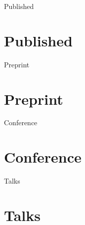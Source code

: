 \documentclass[a4paper,12pt]{article}
\newcommand\myBib[1]{
\begin{btSect}{#1}
\section*{#1}
\btPrintAll
\end{btSect}}
\begin{document}


\myBib{Published}
\myBib{Preprint}
\myBib{Conference}
\myBib{Talks}
\end{document}
